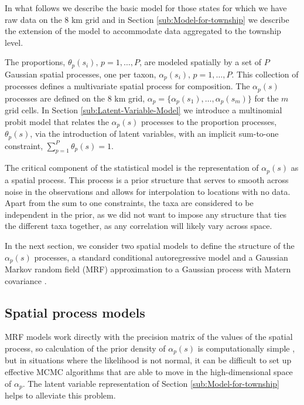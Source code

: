 \documentclass[12pt]{article}\usepackage[]{graphicx}\usepackage[]{color}
\begin{document}
In what follows we describe the basic model for those states for which
we have raw data on the 8 km grid and in Section \ref{sub:Model-for-township}
we describe the extension of the model to accommodate data aggregated
to the township level.

The proportions, $\theta_{p}(s_{i}),\, p=1,\ldots,P$, are modeled
spatially by a set of $P$ Gaussian spatial processes, one per taxon,
$\alpha_{p}(s_{i}),\, p=1,\ldots,P$. This collection of processes
defines a multivariate spatial process for composition. The $\alpha_{p}(s)$
processes are defined on the 8 km grid, $\alpha_{p}=\{\alpha_{p}(s_{1}),\ldots,\alpha_{p}(s_{m})\}$
for the $m$ grid cells. In Section \ref{sub:Latent-Variable-Model}
we introduce a multinomial probit model that relates the $\alpha_{p}(s)$
processes to the proportion processes, $\theta_{p}(s)$, via the introduction
of latent variables, with an implicit sum-to-one constraint, $\sum_{p=1}^{P}\theta_{p}(s)=1$.



The critical component of the statistical model is the representation
of $\alpha_{p}(s)$ as a spatial process. This process is a prior
structure that serves to smooth across noise in the observations and
allows for interpolation to locations with no data. Apart from the
sum to one constraints, the taxa are considered to be independent
in the prior, as we did not want to impose any structure that ties
the different taxa together, as any correlation will likely vary across
space.

In the next section, we consider two spatial models to define the
structure of the $\alpha_{p}(s)$ processes, a standard conditional
autoregressive model \citep{Bane:etal:2003} and a Gaussian Markov
random field (MRF) approximation to a Gaussian process with Matern
covariance \citep{Lind:etal:2011}. 


\subsection{Spatial process models}

MRF models work directly with the precision matrix of the values of
the spatial process, so calculation of the prior density of $\alpha_{p}(s)$
is computationally simple \citep{Rue:Held:2005}, but in situations
where the likelihood is not normal, it can be difficult to set up
effective MCMC algorithms that are able to move in the high-dimensional
space of $\alpha_{p}$. The latent variable representation of Section
\ref{sub:Model-for-township} helps to alleviate this problem.
\end{document}
